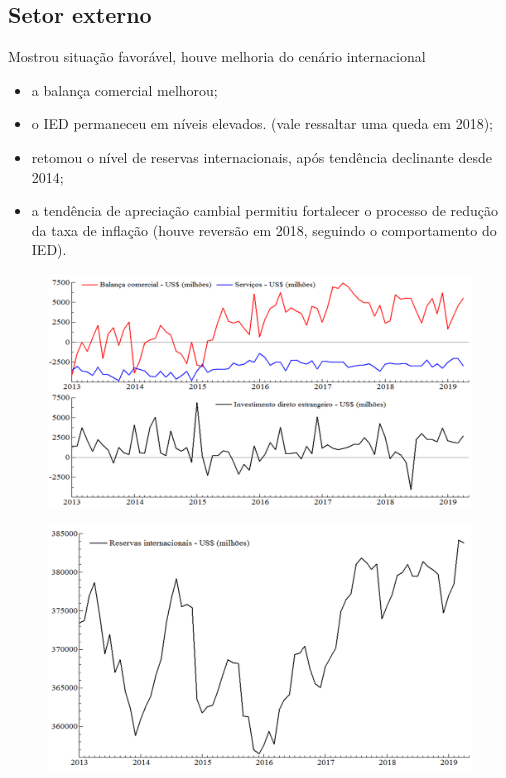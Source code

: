 \documentclass[a4paper,12pt]{article}[abntex2]
\begin{document}
\subsection{\textbf{Setor externo}}
Mostrou situação favorável, houve melhoria do cenário internacional\begin{itemize}
    \item a balança comercial melhorou;
    \item o IED permaneceu em níveis elevados. (vale ressaltar uma queda em 2018);
    \item retomou o nível de reservas internacionais, após tendência declinante desde 2014;
    \item a tendência de apreciação cambial permitiu fortalecer o processo de redução da taxa de inflação (houve reversão em 2018, seguindo o comportamento do IED).
\end{itemize}

\begin{figure}[H]
    \centering
    \includegraphics[width=0.7\linewidth]{Imagens/a19i1.png}
\end{figure}

\begin{figure}[H]
    \centering
    \includegraphics[width=0.7\linewidth]{Imagens/a19i2.png}
\end{figure}
\end{document}
